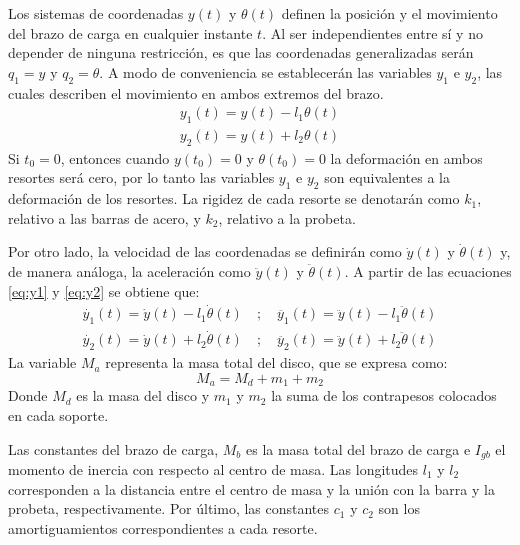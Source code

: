 Los sistemas de coordenadas $y(t)$ y $\theta (t)$ definen la posición y el movimiento del brazo de carga en cualquier instante $t$. Al ser independientes entre sí y no depender de ninguna restricción, es que las coordenadas generalizadas serán $q_1 = y$ y $q_2 = \theta$. A modo de conveniencia se establecerán las variables $y_1$ e $y_2$, las cuales describen el movimiento en ambos extremos del brazo.
\begin{gather}
	y_1(t) = y(t) - l_1\theta(t) \label{eq:y1}\\
	y_2(t) = y(t) + l_2\theta(t) \label{eq:y2}
\end{gather}
Si $t_0=0$, entonces cuando $y(t_0) = 0$ y $\theta(t_0) = 0$ la deformación en ambos resortes será cero, por lo tanto las variables $y_1$ e $y_2$ son equivalentes a la deformación de los resortes. La rigidez de cada resorte se denotarán como $k_1$, relativo a las barras de acero, y $k_2$, relativo a la probeta.

Por otro lado, la velocidad de las coordenadas se definirán como $\dot{y}(t)$ y $\dot{\theta}(t)$ y, de manera análoga, la aceleración como $\ddot{y}(t)$ y $\ddot{\theta}(t)$. A partir de las ecuaciones \ref{eq:y1} y \ref{eq:y2} se obtiene que:
\begin{gather*}
	\dot{y_1}(t) = \dot{y}(t) - l_1\dot{\theta}(t) \quad ;\quad \ddot{y_1}(t) = \ddot{y}(t) - l_1\ddot{\theta}(t) \\
 	\dot{y_2}(t) = \dot{y}(t) + l_2\dot{\theta}(t) \quad ;\quad \ddot{y_2}(t) = \ddot{y}(t) + l_2\ddot{\theta}(t) 
\end{gather*}
La variable $M_a$ representa la masa total del disco, que se expresa como:
\begin{equation}\label{eq:m_a}
	M_a = M_d + m_1 + m_2
\end{equation}
Donde $M_d$ es la masa del disco y $m_1$ y $m_2$ la suma de los contrapesos colocados en cada soporte. 

Las constantes del brazo de carga, $M_b$ es la masa total del brazo de carga e $I_{gb}$ el momento de inercia con respecto al centro de masa. Las longitudes $l_1$ y $l_2$ corresponden a la distancia entre el centro de masa y la unión con la barra y la probeta, respectivamente. Por último, las constantes $c_1$ y $c_2$ son los amortiguamientos correspondientes a cada resorte.


